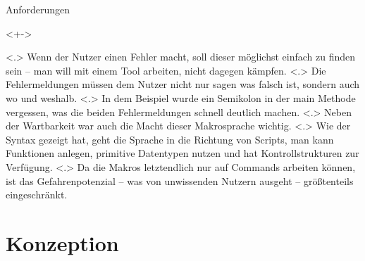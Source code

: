 \begin{frame}{Anforderungen}
\begin{itemize}
        \begin{uncoverenv}<+->
          \begin{myInvBox}[width=.9\linewidth]
            
          \end{myInvBox}
          \vspace{-6em}
        \end{uncoverenv}
            \note[item]<.>{
              Wenn der Nutzer einen Fehler macht, soll dieser möglichst einfach zu finden sein -- man will mit einem Tool arbeiten, nicht dagegen kämpfen.
            }
            \note[item]<.>{
              Die Fehlermeldungen müssen dem Nutzer nicht nur sagen was falsch ist, sondern auch wo und weshalb.
            }
            \note[item]<.>{
              In dem Beispiel wurde ein Semikolon in der main Methode vergessen, was die beiden Fehlermeldungen schnell deutlich machen.
            }
        \onslide<+->
            \note[item]<.>{
              Neben der Wartbarkeit war auch die Macht dieser Makrosprache wichtig.
            }
            \note[item]<.>{
              Wie der Syntax gezeigt hat, geht die Sprache in die Richtung von Scripts, man kann Funktionen anlegen, primitive Datentypen nutzen und hat Kontrollstrukturen zur Verfügung.
            }
            \note[item]<.>{
              Da die Makros letztendlich nur auf Commands arbeiten können, ist das Gefahrenpotenzial -- was von unwissenden Nutzern ausgeht -- größtenteils eingeschränkt.
            }
    \end{itemize}
  \end{frame}

\section{Konzeption}

